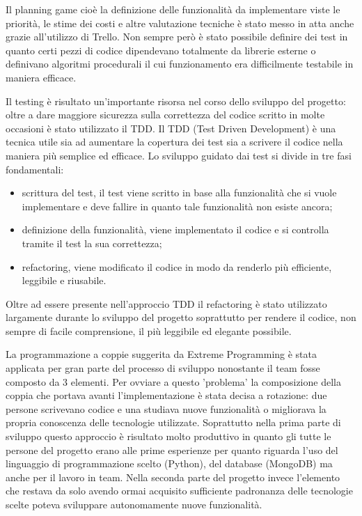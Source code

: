 \documentclass[12pt]{report}
\begin{document}
Il planning game cioè la definizione delle funzionalità da implementare viste le priorità, le stime dei costi e altre valutazione tecniche è stato messo in atta anche grazie all'utilizzo di Trello. Non sempre però è stato possibile definire dei test in quanto certi pezzi di codice dipendevano totalmente da librerie esterne o definivano algoritmi procedurali il cui funzionamento era difficilmente testabile in maniera efficace.

Il testing è risultato un'importante risorsa nel corso dello sviluppo del progetto: oltre a dare maggiore sicurezza sulla correttezza del codice scritto in molte occasioni è stato utilizzato il TDD. Il TDD (Test Driven Development) è una tecnica utile sia ad aumentare la copertura dei test sia a scrivere il codice nella maniera più semplice ed efficace. Lo sviluppo guidato dai test si divide in tre fasi fondamentali:
\begin{itemize}
\item scrittura del test, il test viene scritto in base alla funzionalità che si vuole implementare e deve fallire in quanto tale funzionalità non esiste ancora;
\item definizione della funzionalità, viene implementato il codice e si controlla tramite il test la sua correttezza;
\item refactoring, viene modificato il codice in modo da renderlo più efficiente, leggibile e riusabile.
\end{itemize} 

Oltre ad essere presente nell'approccio TDD il refactoring è stato utilizzato largamente durante lo sviluppo del progetto soprattutto per rendere il codice, non sempre di facile comprensione, il più leggibile ed elegante possibile.

La programmazione a coppie suggerita da Extreme Programming è stata applicata per gran parte del processo di sviluppo nonostante il team fosse composto da 3 elementi. Per ovviare a questo 'problema' la composizione della coppia che portava avanti l'implementazione è stata decisa a rotazione: due persone scrivevano codice e una studiava nuove funzionalità o migliorava la propria conoscenza delle tecnologie utilizzate. Soprattutto nella prima parte di sviluppo questo approccio è risultato molto produttivo in quanto gli tutte le persone del progetto erano alle prime esperienze per quanto riguarda l'uso del linguaggio di programmazione scelto (Python), del database (MongoDB) ma anche per il lavoro in team. Nella seconda parte del progetto invece l'elemento che restava da solo avendo ormai acquisito sufficiente padronanza delle tecnologie scelte poteva sviluppare autonomamente nuove funzionalità.
\end{document}
